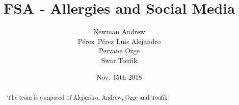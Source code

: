 \documentclass[11pt]{article}
\begin{document}
\sloppy

\title{{\bf FSA - Allergies and Social Media}}

\author{Newman Andrew\\ P\'erez~P\'erez Luis Alejandro\\ Pervane Ozge\\ Swar Toufik}

\date{Nov. 15th 2018}


\maketitle


\begin{abstract}
The team is composed of Alejandro, Andrew, Ozge and Toufik.
\end{abstract}

\newpage

\tableofcontents

\newpage












\end{document}

